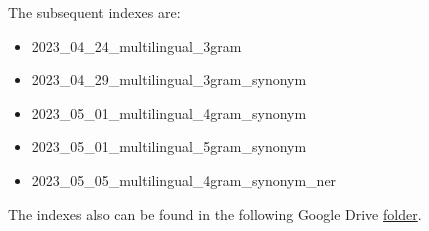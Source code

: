 The subsequent indexes are:
\begin{itemize}
	\item 2023\_04\_24\_multilingual\_3gram
	\item 2023\_04\_29\_multilingual\_3gram\_synonym
	\item 2023\_05\_01\_multilingual\_4gram\_synonym
	\item 2023\_05\_01\_multilingual\_5gram\_synonym
	\item 2023\_05\_05\_multilingual\_4gram\_synonym\_ner
\end{itemize}
The indexes also can be found in the following Google Drive \href{https://drive.google.com/drive/folders/1CK_kLeZ5Us3VJe8hiG1vhwPrDs94cLvU?usp=share_link}{folder}.